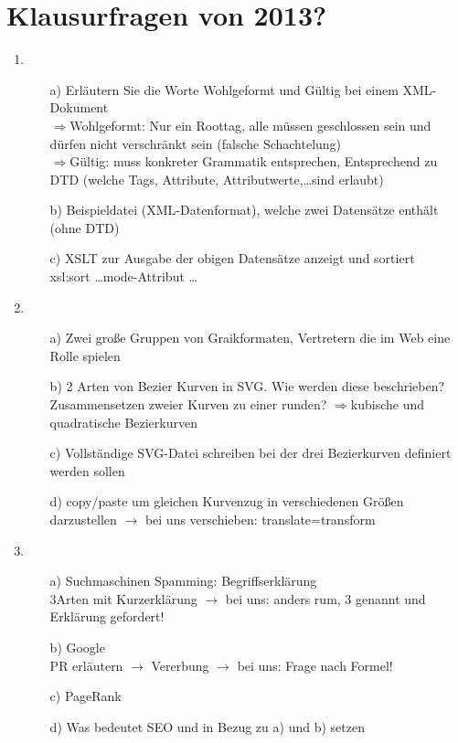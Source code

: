 \chapter{Klausurfragen von 2013?}
\begin{enumerate}
\item \begin{itemize}
  \item[a)]Erläutern Sie die Worte Wohlgeformt und Gültig bei einem XML-Dokument\\
  $\Rightarrow$Wohlgeformt: Nur ein Roottag, alle müssen geschlossen sein und dürfen nicht verschränkt sein (falsche Schachtelung)\\
  $\Rightarrow$Gültig: muss konkreter Grammatik entsprechen, Entsprechend zu DTD (welche Tags, Attribute, Attributwerte,\dots sind erlaubt)
  \item[b)] Beispieldatei (XML-Datenformat), welche zwei Datensätze enthält (ohne DTD)
  \item[c)] XSLT zur Ausgabe der obigen Datensätze anzeigt und sortiert\\
xsl:sort \dots mode-Attribut \dots
  \end{itemize}
\item \begin{itemize}
  \item[a)]Zwei große Gruppen von Graikformaten, Vertretern die im Web eine Rolle spielen
  \item[b)]2 Arten von Bezier Kurven in SVG. Wie werden diese beschrieben? Zusammensetzen zweier Kurven zu einer runden?
  $\Rightarrow$kubische und quadratische Bezierkurven
  \item[c)]Vollständige SVG-Datei schreiben bei der drei Bezierkurven definiert werden sollen\\
  \item[d)]copy/paste um gleichen Kurvenzug in verschiedenen Größen darzustellen $\rightarrow$ bei uns verschieben: translate=transform
\end{itemize}
\item \begin{itemize}
  \item[a)]Suchmaschinen Spamming: Begriffserklärung\\
  3Arten mit Kurzerklärung $\rightarrow$ bei uns: anders rum, 3 genannt und Erklärung gefordert!
  \item[b)]Google\\
  PR erläutern $\rightarrow$ Vererbung $\rightarrow$ bei uns: Frage nach Formel!
  \item[c)]PageRank
  \item[d)]Was bedeutet SEO und in Bezug zu a) und b) setzen
\end{itemize}
\end{enumerate}
